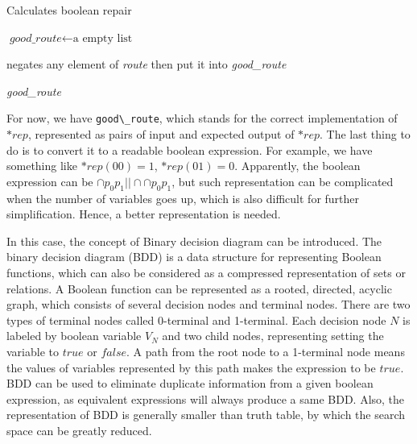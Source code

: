 \begin{algorithm}
\caption{Calculates boolean repair}
\begin{algorithmic}[1]
\STATE $\textit{good\_route} \gets \text{a empty list}$
\STATE

  \STATE negates any element of \textit{route} then put it into \textit{good\_route}
\ENDFOR

\STATE
\RETURN \textit{good\_route}

\end{algorithmic}
\end{algorithm}

For now, we have \lstinline|good\_route|, which stands for the correct implementation of $*rep$, represented as pairs of input and expected output of $*rep$. The last thing to do is to convert it to a readable boolean expression.
For example, we have something like $*rep(00) = 1$, $*rep(01) = 0$. Apparently, the boolean expression can be $\cap{p_{0}p_{1}} || \cap{\cap{p_{0}}p_{1}}$,
but such representation can be complicated when the number of variables goes up, which is also difficult for further simplification.
Hence, a better representation is needed.

In this case, the concept of Binary decision diagram\cite{BDD} can be introduced.
The binary decision diagram (BDD) is a data structure for representing Boolean functions, which can also be considered as a compressed representation of sets or relations\cite{TfEFVUBDD,FtOVOfBDD}.
A Boolean function can be represented as a rooted, directed, acyclic graph, which consists of several decision nodes and terminal nodes. There are two types of terminal nodes called 0-terminal and 1-terminal.
Each decision node $N$ is labeled by boolean variable $V_{N}$ and two child nodes, representing setting the variable to $true$ or $false$.
A path from the root node to a 1-terminal node means the values of variables represented by this path makes the expression to be $true$.
BDD can be used to eliminate duplicate information from a given boolean expression, as equivalent expressions will always produce a same BDD. Also, the representation of BDD is generally smaller than truth table,
by which the search space can be greatly reduced.


